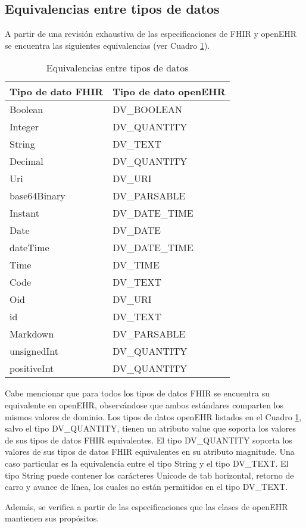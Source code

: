 \subsection{Equivalencias entre tipos de datos}

A partir de una revisión exhaustiva de las especificaciones de FHIR y openEHR se encuentra las siguientes equivalencias (ver Cuadro \ref{table:equivalents}).

\begin{table}
  \caption{Equivalencias entre tipos de datos}
  \label{table:equivalents}
  \begin{tabular}{l l}
    \hline
    Tipo de dato FHIR &	Tipo de dato openEHR \\
    \hline
    Boolean	& DV\_BOOLEAN \\
    Integer	& DV\_QUANTITY \\
    String	& DV\_TEXT \\
    Decimal	& DV\_QUANTITY \\
    Uri	& DV\_URI \\
    base64Binary	& DV\_PARSABLE \\
    Instant	& DV\_DATE\_TIME \\
    Date	& DV\_DATE \\
    dateTime	& DV\_DATE\_TIME \\
    Time	& DV\_TIME \\
    Code	& DV\_TEXT \\
    Oid	& DV\_URI \\
    id 	& DV\_TEXT \\
    Markdown	& DV\_PARSABLE \\
    unsignedInt	& DV\_QUANTITY \\
    positiveInt	& DV\_QUANTITY \\
    \hline
  \end{tabular}
\end{table}

Cabe mencionar que para todos los tipos de datos FHIR se encuentra su equivalente en openEHR, observándose que ambos estándares comparten los mismos valores de dominio. Los tipos de datos openEHR listados en el Cuadro \ref{table:equivalents}, salvo el tipo DV\_QUANTITY, tienen un atributo value que soporta los valores de sus tipos de datos FHIR equivalentes. El tipo DV\_QUANTITY soporta los valores de sus tipos de datos FHIR equivalentes en su atributo magnitude. Una caso particular es la equivalencia entre el tipo String y el tipo DV\_TEXT. El tipo String puede contener los carácteres Unicode  de tab horizontal, retorno de carro y avance de línea, los cuales no están permitidos en el tipo DV\_TEXT.

Además, se verifica a partir de las especificaciones que las clases de openEHR mantienen sus propósitos.
